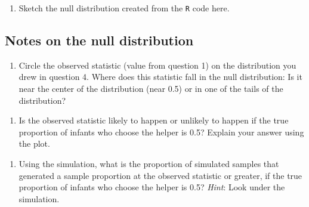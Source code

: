 \documentclass[
]{report}
\providecommand{\tightlist}{%
  \setlength{\itemsep}{0pt}\setlength{\parskip}{0pt}}
\begin{document}
\begin{enumerate}
\def\labelenumi{\arabic{enumi}.}
\setcounter{enumi}{3}
\tightlist
\item
  Sketch the null distribution created from the \texttt{R} code here.
\end{enumerate}

\vspace{1.8in}

\subsection*{Notes on the null distribution}\label{notes-on-the-null-distribution}

\vspace{2in}

\begin{enumerate}
\def\labelenumi{\arabic{enumi}.}
\setcounter{enumi}{4}
\tightlist
\item
  Circle the observed statistic (value from question 1) on the distribution you drew in question 4. Where does this statistic fall in the null distribution: Is it near the center of the distribution (near 0.5) or in one of the tails of the distribution?
\end{enumerate}

\vspace{0.3in}

\begin{enumerate}
\def\labelenumi{\arabic{enumi}.}
\setcounter{enumi}{5}
\tightlist
\item
  Is the observed statistic likely to happen or unlikely to happen if the true proportion of infants who choose the helper is 0.5? Explain your answer using the plot.
\end{enumerate}

\vspace{0.5in}

\begin{enumerate}
\def\labelenumi{\arabic{enumi}.}
\setcounter{enumi}{6}
\tightlist
\item
  Using the simulation, what is the proportion of simulated samples that generated a sample proportion at the observed statistic or greater, if the true proportion of infants who choose the helper is 0.5? \emph{Hint}: Look under the simulation.
\end{enumerate}

\vspace{0.3in}
\end{document}
